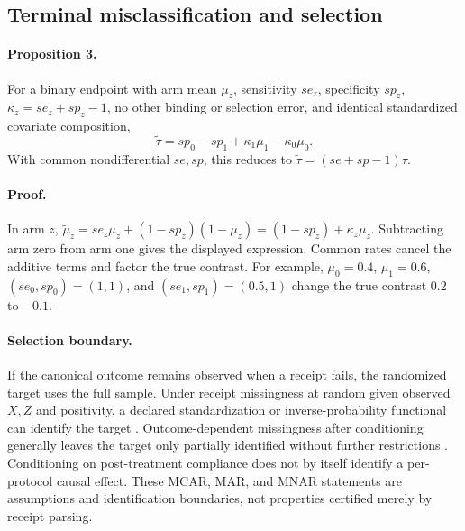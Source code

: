\documentclass{article}
\begin{document}
\subsection{Terminal misclassification and selection}

\paragraph{Proposition 3.}
For a binary endpoint with arm mean $\mu_z$, sensitivity $se_z$, specificity $sp_z$, $\kappa_z=se_z+sp_z-1$, no other binding or selection error, and identical standardized covariate composition,
\begin{equation}
\widetilde\tau=sp_0-sp_1+\kappa_1\mu_1-\kappa_0\mu_0.
\end{equation}
With common nondifferential $se,sp$, this reduces to $\widetilde\tau=(se+sp-1)\tau$.

\paragraph{Proof.}
In arm $z$, $\widetilde\mu_z=se_z\mu_z+(1-sp_z)(1-\mu_z)=(1-sp_z)+\kappa_z\mu_z$. Subtracting arm zero from arm one gives the displayed expression. Common rates cancel the additive terms and factor the true contrast. For example, $\mu_0=0.4$, $\mu_1=0.6$, $(se_0,sp_0)=(1,1)$, and $(se_1,sp_1)=(0.5,1)$ change the true contrast $0.2$ to $-0.1$.

\paragraph{Selection boundary.}
If the canonical outcome remains observed when a receipt fails, the randomized target uses the full sample. Under receipt missingness at random given observed $X,Z$ and positivity, a declared standardization or inverse-probability functional can identify the target \citep{robinsrotnitzkyzhao1994}. Outcome-dependent missingness after conditioning generally leaves the target only partially identified without further restrictions \citep{manski1990,imbensmanski2004}. Conditioning on post-treatment compliance does not by itself identify a per-protocol causal effect. These MCAR, MAR, and MNAR statements are assumptions and identification boundaries, not properties certified merely by receipt parsing.
\end{document}
